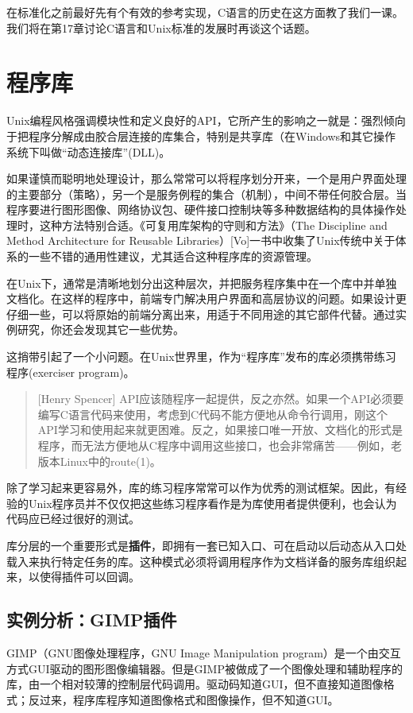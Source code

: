 \documentclass[12pt,oneside]{book}
\begin{document}
\begin{common-format}
在标准化之前最好先有个有效的参考实现，C语言的历史在这方面教了我们一课。我们将在第17章讨论C语言和Unix标准的发展时再谈这个话题。


\section{程序库}
Unix编程风格强调模块性和定义良好的API，它所产生的影响之一就是：强烈倾向于把程序分解成由胶合层连接的库集合，特别是共享库（在Windows和其它操作系统下叫做“动态连接库”(DLL)。

如果谨慎而聪明地处理设计，那么常常可以将程序划分开来，一个是用户界面处理的主要部分（策略），另一个是服务例程的集合（机制），中间不带任何胶合层。当程序要进行图形图像、网络协议包、硬件接口控制块等多种数据结构的具体操作处理时，这种方法特别合适。《可复用库架构的守则和方法》（The Discipline and Method Architecture for Reusable Libraries）[Vo]一书中收集了Unix传统中关于体系的一些不错的通用性建议，尤其适合这种程序库的资源管理。

在Unix下，通常是清晰地划分出这种层次，并把服务程序集中在一个库中并单独文档化。在这样的程序中，前端专门解决用户界面和高层协议的问题。如果设计更仔细一些，可以将原始的前端分离出来，用适于不同用途的其它部件代替。通过实例研究，你还会发现其它一些优势。

这捎带引起了一个小问题。在Unix世界里，作为“程序库”发布的库必须携带练习程序(exerciser program)。

\begin{quote}[Henry Spencer]
API应该随程序一起提供，反之亦然。如果一个API必须要编写C语言代码来使用，考虑到C代码不能方便地从命令行调用，刚这个API学习和使用起来就更困难。反之，如果接口唯一开放、文档化的形式是程序，而无法方便地从C程序中调用这些接口，也会非常痛苦——例如，老版本Linux中的route(1)。
\end{quote}

除了学习起来更容易外，库的练习程序常常可以作为优秀的测试框架。因此，有经验的Unix程序员并不仅仅把这些练习程序看作是为库使用者提供便利，也会认为代码应已经过很好的测试。

库分层的一个重要形式是\textbf{插件}，即拥有一套已知入口、可在启动以后动态从入口处载入来执行特定任务的库。这种模式必须将调用程序作为文档详备的服务库组织起来，以使得插件可以回调。


\subsection{实例分析：GIMP插件}
GIMP（GNU图像处理程序，GNU Image Manipulation program）是一个由交互方式GUI驱动的图形图像编辑器。但是GIMP被做成了一个图像处理和辅助程序的库，由一个相对较薄的控制层代码调用。驱动码知道GUI，但不直接知道图像格式；反过来，程序库程序知道图像格式和图像操作，但不知道GUI。


\end{common-format}
\end{document}
